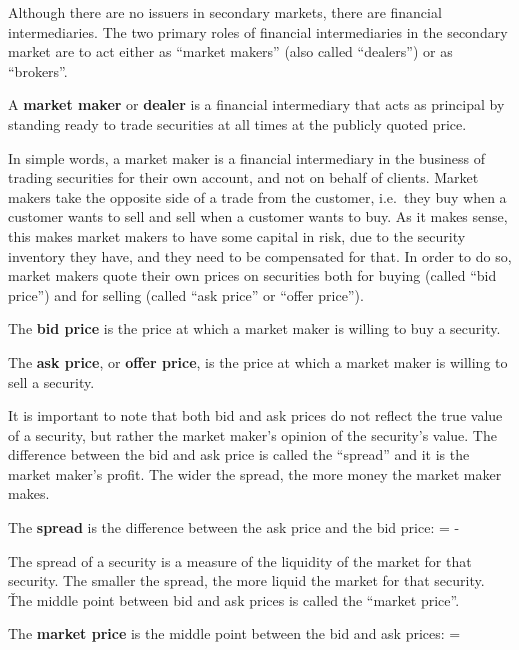 Although there are no issuers in secondary markets, there are financial intermediaries. The two primary roles of
financial intermediaries in the secondary market are to act either as ``market makers'' (also called ``dealers'') or
as ``brokers''.

A \textbf{market maker} or \textbf{dealer} is a financial intermediary that acts as principal by standing ready to
trade securities at all times at the publicly quoted price.
\ed

In simple words, a market maker is a financial intermediary in the business of trading securities for their own
account, and not on behalf of clients. Market makers take the opposite side of a trade from the customer, i.e.\ they
buy when a customer wants to sell and sell when a customer wants to buy. As it makes sense, this makes market makers
to have some capital in risk, due to the security inventory they have, and they need to be compensated for that. In
order to do so, market makers quote their own prices on securities both for buying (called ``bid price'') and for
selling (called ``ask price'' or ``offer price'').

The \textbf{bid price} is the price at which a market maker is willing to buy a security.
\ed

The \textbf{ask price}, or \textbf{offer price}, is the price at which a market maker is willing to sell a security.
\ed

It is important to note that both bid and ask prices do not reflect the true value of a security, but rather the market
maker's opinion of the security's value. The difference between the bid and ask price is called the ``spread'' and it
is the market maker's profit. The wider the spread, the more money the market maker makes.

\bd[Spread]
The \textbf{spread} is the difference between the ask price and the bid price:
\bse
{} =  - 
\ese
\ed

The spread of a security is a measure of the liquidity of the market for that security. The smaller the spread, the
more liquid the market for that security. \v

The middle point between bid and ask prices is called the ``market price''.

The \textbf{market price} is the middle point between the bid and ask prices:
\bse
{} = 
\ese
\ed

